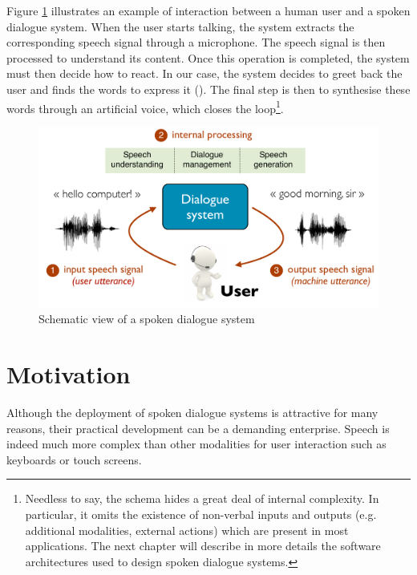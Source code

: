 Figure \ref{fig:basicsds} illustrates an example of interaction between a human user and a spoken dialogue system. When the user starts talking, the system extracts the corresponding speech signal through a microphone.  The speech signal is then processed to understand its content.  Once this operation is completed, the system must then decide how to react.  In our case, the system decides to greet back the user and finds the words to express it (). The final step is then to synthesise these words through an artificial voice, which closes the loop\footnote{ Needless to say, the schema hides a great deal of internal complexity.  In particular, it omits the existence of non-verbal inputs and outputs (e.g. additional modalities, external actions) which are present in most applications.  The next chapter will describe in more details the software architectures used to design spoken dialogue systems.}.

\begin{figure}[h]
\center
\includegraphics[scale=0.45]{imgs/basicsds.pdf}
\caption{Schematic view of a spoken dialogue system}
\label{fig:basicsds}
\end{figure}

\section{Motivation}

Although the deployment of spoken dialogue systems is attractive for many reasons, their practical development can be a demanding enterprise. Speech is indeed much more complex than other modalities for user interaction such as keyboards or touch screens.  

